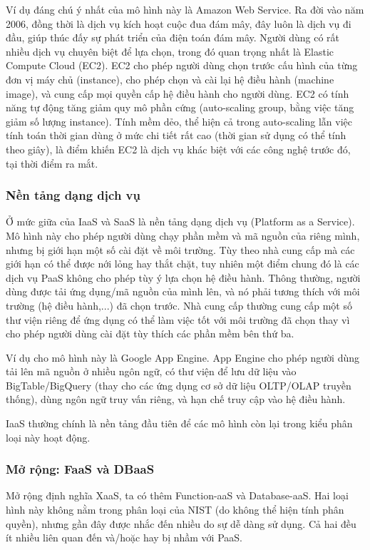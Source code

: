 \documentclass{article}
\begin{document}
Ví dụ đáng chú ý nhất của mô hình này là Amazon Web Service. Ra đời vào năm
2006, đồng thời là dịch vụ kích hoạt cuộc đua đám mây, đây luôn là dịch vụ đi
đầu, giúp thúc đấy sự phát triển của điện toán đám mây. Người dùng có rất nhiều
dịch vụ chuyên biệt để lựa chọn, trong đó quan trọng nhất là Elastic Compute
Cloud (EC2). EC2 cho phép người dùng chọn trước cấu hình của từng đơn vị máy chủ
(instance), cho phép chọn và cài lại hệ điều hành (machine image), và cung cấp
mọi quyền cấp hệ điều hành cho người dùng. EC2 có tính năng tự động tăng giảm
quy mô phần cứng (auto-scaling group, bằng việc tăng giảm số lượng instance).
Tính mềm dẻo, thể hiện cả trong auto-scaling lẫn việc tính toán thời gian dùng ở
mức chi tiết rất cao (thời gian sử dụng có thể tính theo giây), là điểm khiến
EC2 là dịch vụ khác biệt với các công nghệ trước đó, tại thời điểm ra mắt.

\subsubsection{Nền tảng dạng dịch vụ}

Ở mức giữa của IaaS và SaaS là nền tảng dạng dịch vụ (Platform as a Service). Mô
hình này cho phép người dùng chạy phần mềm và mã nguồn của riêng mình, nhưng bị
giới hạn một số cài đặt về môi trường. Tùy theo nhà cung cấp mà các giới hạn có
thể được nới lỏng hay thắt chặt, tuy nhiên một điểm chung đó là các dịch vụ PaaS
không cho phép tùy ý lựa chọn hệ điều hành. Thông thường, người dùng được tải
ứng dụng/mã nguồn của mình lên, và nó phải tương thích với môi trường (hệ điều
hành,...) đã chọn trước. Nhà cung cấp thường cung cấp một số thư viện riêng để
ứng dụng có thể làm việc tốt với môi trường đã chọn thay vì cho phép người dùng
cài đặt tùy thích các phần mềm bên thứ ba.

Ví dụ cho mô hình này là Google App Engine. App Engine cho phép người dùng tải
lên mã nguồn ở nhiều ngôn ngữ, có thư viện để lưu dữ liệu vào BigTable/BigQuery
(thay cho các ứng dụng cơ sở dữ liệu OLTP/OLAP truyền thống), dùng ngôn ngữ truy
vấn riêng, và hạn chế truy cập vào hệ điều hành.

IaaS thường chính là nền tảng đầu tiên để các mô hình còn lại trong kiểu phân
loại này hoạt động.

\subsubsection{Mở rộng: FaaS và DBaaS}

Mở rộng định nghĩa XaaS, ta có thêm Function-aaS và Database-aaS. Hai loại hình
này không nằm trong phân loại của NIST (do không thể hiện tính phân quyền),
nhưng gần đây được nhắc đến nhiều do sự dễ dàng sử dụng. Cả hai đều ít nhiều
liên quan đến và/hoặc hay bị nhầm với PaaS.
\end{document}
